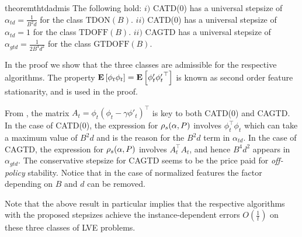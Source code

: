 \FloatBarrier
\begin{table}[h]
\caption{Here, $S,A,\gamma$ are fixed across all the class and the second column shows the quantities that vary across the respective classes. These three capture \emph{on/off-policy} learning scenarios arising in RL.}
\end{table}
\fi
\begin{restatable}{theorem}{thtdadmis}\label{th:tdadmis}
The following hold:
$i)$ CATD(0) has a universal stepsize of $\alpha_{td}=\frac{1}{B^2d}$ for  the class $\text{TDON}(B)$.
$ii)$ CATD(0) has a universal stepsize of $\alpha_{td}=1$ for  the class $\text{TDOFF}(B)$.
$ii)$ CAGTD has a universal stepsize of $\alpha_{gtd}=\frac{1}{2B^4d^2}$ for the class $\text{GTDOFF}(B)$.
\end{restatable}
In the proof we show that the three classes are admissible for the respective algorithms.
The property $\mathbf{E}\left[\phi_t\phi_t\right]=\mathbf{E}\left[\phi'_t{\phi'_t}^\top\right]$ is known as second order feature stationarity, and is used in the proof.
\fi

 From , the matrix $A_t=\phi_t(\phi_t-\gamma\phi'_t)^\top$ is key to both CATD(0) and CAGTD. In the case of CATD(0),  the expression for $\rho_s(\alpha,P)$ involves $\phi^\top_t\phi_t$ which can take a maximum value of $B^2d$  and is the reason for the $B^2d$ term in $\alpha_{td}$. In the case of CAGTD, the expression for $\rho_s(\alpha,P)$ involves $A_t^\top A_t$, and hence $B^4d^2$ appears in $\alpha_{gtd}$. 
The conservative stepsize for CAGTD seems to be the price paid for \emph{off-policy} stability. Notice that in the case of normalized features the factor depending on $B$ and $d$ can be removed.

Note that the above result in particular implies that the respective algorithms with the proposed stepsizes achieve the instance-dependent errors $O(\frac{1}{t})$ on these three classes of LVE problems.

